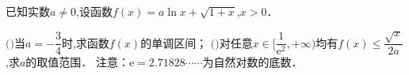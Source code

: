 \begin{solution}{6cm}

\end{solution}
\question[15] 已知实数$a\neq 0$,设函数$f(x)=a\ln x+ \sqrt {1+x}$,$x  \gt  0$．
\begin{subquestions}
    \subquestion $($$)$当$a=- \dfrac {3}{4}$时,求函数$f(x)$的单调区间；
    \subquestion $($$)$对任意$x \in \Big[ \dfrac {1}{\mathrm e^{2}} , + \infty \Big)$均有$f(x)\leqslant \dfrac { \sqrt {x}}{2a}$,求$a$的取值范围．
    \subquestion 注意：$\mathrm e=2.71828 \cdots  \cdots $为自然对数的底数．
\end{subquestions}
\begin{solution}{6cm}

\end{solution}
